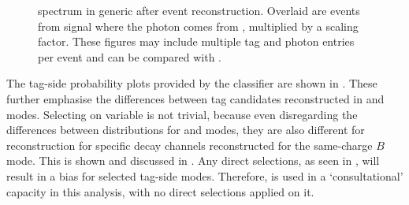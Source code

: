 \begin{figure}[htbp!]
    \centering
    \caption{\label{fig:spectrum_after_reco} \BtoXsgamma spectrum in generic \MC after event reconstruction.
    Overlaid are events from signal \MC where the photon comes from \BtoXsgamma, multiplied by a scaling factor.
    These figures may include multiple tag and photon entries per event and can be compared with .
    }
\end{figure}

The tag-side probability plots provided by the \FEI classifier are shown in .
These further emphasise the differences between tag candidates reconstructed in \FEI \Bp and \FEI \Bz modes.
Selecting on \feiProb variable is not trivial, 
because even disregarding the differences between distributions for \FEI \Bp and \Bz modes, 
they are also different for reconstruction for specific decay channels reconstructed for the same-charge $B$ mode.
This is shown and discussed in  .
Any direct selections, as seen in , will result in a bias for selected tag-side modes.
Therefore, \feiProb is used in a `consultational' capacity in this analysis, with no direct selections applied on it.

